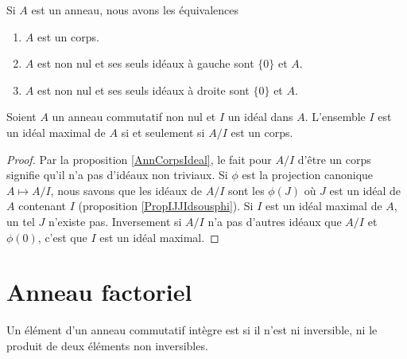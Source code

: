 \begin{proposition}     \label{AnnCorpsIdeal}
    Si \( A\) est un anneau, nous avons les équivalences
    \begin{enumerate}
        \item
            \( A\) est un corps.
        \item
            \( A\) est non nul et ses seuls idéaux à gauche sont \( \{ 0 \}\) et \( A\).
        \item
            \( A\) est non nul et ses seuls idéaux à droite sont \( \{ 0 \}\) et \( A\).
    \end{enumerate}
\end{proposition}

\begin{proposition}
    Soient \( A\) un anneau commutatif non nul et \( I\) un idéal dans \( A\). L'ensemble \( I\) est un idéal maximal de \( A\) si et seulement si \( A/I\) est un corps.
\end{proposition}

\begin{proof}
    Par la proposition \ref{AnnCorpsIdeal}, le fait pour \( A/I\) d'être un corps signifie qu'il n'a pas d'idéaux non triviaux. Si \( \phi\) est la projection canonique \( A\mapsto A/I\), nous savons que les idéaux de \( A/I\) sont les \( \phi(J)\) où \( J\) est un idéal de \( A\) contenant \( I\) (proposition \ref{PropIJJIdsousphi}). Si \( I\) est un idéal maximal de \( A\), un tel \( J\) n'existe pas. Inversement si \( A/I\) n'a pas d'autres idéaux que \( A/I\) et \( \phi(0)\), c'est que \( I\) est un idéal maximal.
\end{proof}

\section{Anneau factoriel}

\begin{definition}  \label{DeirredBDhQfA}
    Un élément d'un anneau commutatif intègre est  si il n'est ni inversible, ni le produit de deux éléments non inversibles.
\end{definition}

